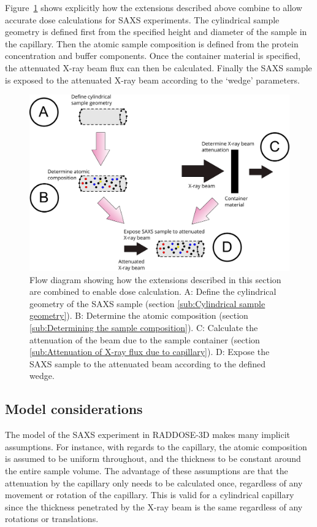 Figure~\ref{fig:SAXS Flow diagram} shows explicitly how the extensions described above combine to allow accurate dose calculations for SAXS experiments.
The cylindrical sample geometry is defined first from the specified height and diameter of the sample in the capillary.
Then the atomic sample composition is defined from the protein concentration and buffer components.
Once the container material is specified, the attenuated X-ray beam flux can then be calculated.
Finally the SAXS sample is exposed to the attenuated X-ray beam according to the `wedge' parameters.
\begin{figure}
    \centering
    \includegraphics[width=1\textwidth]{figures/saxs/SAXS_flowchart.pdf}
    \caption[Flow diagram summarising the SAXS extensions to RADDOSE-3D.]{Flow diagram showing how the extensions described in this section are combined to enable dose calculation.
    A: Define the cylindrical geometry of the SAXS sample (section \ref{sub:Cylindrical sample geometry}).
    B: Determine the atomic composition (section \ref{sub:Determining the sample composition}).
    C: Calculate the attenuation of the beam due to the sample container (section \ref{sub:Attenuation of X-ray flux due to capillary}).
    D: Expose the SAXS sample to the attenuated beam according to the defined wedge.}
    \label{fig:SAXS Flow diagram}
\end{figure}

\subsection{Model considerations}
\label{sub:Model considerations}
The model of the SAXS experiment in RADDOSE-3D makes many implicit assumptions.
For instance, with regards to the capillary, the atomic composition is assumed to be uniform throughout, and the thickness to be constant around the entire sample volume.
The advantage of these assumptions are that the attenuation by the capillary only needs to be calculated once, regardless of any movement or rotation of the capillary.
This is valid for a cylindrical capillary since the thickness penetrated by the X-ray beam is the same regardless of any rotations or translations.

